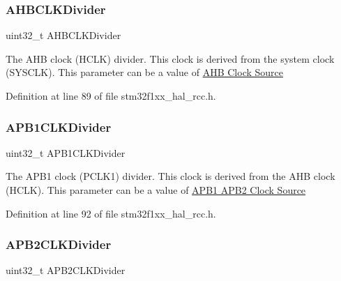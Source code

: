 \subsubsection{\texorpdfstring{A\+H\+B\+C\+L\+K\+Divider}{AHBCLKDivider}}
{\footnotesize\ttfamily uint32\+\_\+t A\+H\+B\+C\+L\+K\+Divider}

The A\+HB clock (H\+C\+LK) divider. This clock is derived from the system clock (S\+Y\+S\+C\+LK). This parameter can be a value of \hyperlink{group___r_c_c___a_h_b___clock___source}{A\+HB Clock Source} 

Definition at line 89 of file stm32f1xx\+\_\+hal\+\_\+rcc.\+h.

\mbox{\label{struct_r_c_c___clk_init_type_def_a994aca51c40decfc340e045da1a6ca19}} 
\subsubsection{\texorpdfstring{A\+P\+B1\+C\+L\+K\+Divider}{APB1CLKDivider}}
{\footnotesize\ttfamily uint32\+\_\+t A\+P\+B1\+C\+L\+K\+Divider}

The A\+P\+B1 clock (P\+C\+L\+K1) divider. This clock is derived from the A\+HB clock (H\+C\+LK). This parameter can be a value of \hyperlink{group___r_c_c___a_p_b1___a_p_b2___clock___source}{A\+P\+B1 A\+P\+B2 Clock Source} 

Definition at line 92 of file stm32f1xx\+\_\+hal\+\_\+rcc.\+h.

\mbox{\label{struct_r_c_c___clk_init_type_def_a9bbc30e9f4ddf462bc1fa6ea273eb4db}} 
\subsubsection{\texorpdfstring{A\+P\+B2\+C\+L\+K\+Divider}{APB2CLKDivider}}
{\footnotesize\ttfamily uint32\+\_\+t A\+P\+B2\+C\+L\+K\+Divider}

